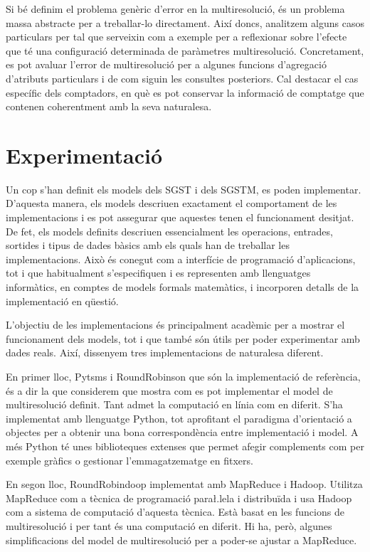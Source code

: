 Si bé definim el problema genèric d'error en la multiresolució, és un
problema massa abstracte per a treballar-lo directament. Així doncs,
analitzem alguns casos particulars per tal que serveixin com a exemple
per a reflexionar sobre l'efecte que té una configuració determinada
de paràmetres multiresolució. Concretament, es pot avaluar l'error de
multiresolució per a algunes funcions d'agregació d'atributs
particulars i de com siguin les consultes posteriors. Cal destacar el
cas específic dels comptadors, en què es pot conservar la informació
de comptatge que contenen coherentment amb la seva naturalesa.



\section{Experimentació}


Un cop s'han definit els models dels \gls{SGST} i dels \gls{SGSTM}, es
poden implementar. D'aquesta manera, els models descriuen exactament el
comportament de les implementacions i es pot assegurar que aquestes
tenen el funcionament desitjat.  De fet, els models definits descriuen
essencialment les operacions, entrades, sortides i tipus de dades
bàsics amb els quals han de treballar les implementacions. Això és
conegut com a interfície de programació d'aplicacions, tot i que
habitualment s'especifiquen i es representen amb llenguatges
informàtics, en comptes de models formals matemàtics, i incorporen
detalls de la implementació en qüestió.


L'objectiu de les implementacions és principalment acadèmic per a
mostrar el funcionament dels models, tot i que també són útils per
poder experimentar amb dades reals. Així, dissenyem tres
implementacions de naturalesa diferent. 



En primer lloc, Pytsms i RoundRobinson que són la implementació de
referència, és a dir la que considerem que mostra com es pot
implementar el model de multiresolució definit.  Tant admet la
computació en línia com en diferit.  S'ha implementat amb llenguatge
Python, tot aprofitant el paradigma d'orientació a objectes per a
obtenir una bona correspondència entre implementació i model. A més
Python té unes biblioteques extenses que permet afegir complements com
per exemple gràfics o gestionar l'emmagatzematge en fitxers.


En segon lloc, RoundRobindoop implementat amb MapReduce i
Hadoop. Utilitza MapReduce com a tècnica de programació para\l.lela i
distribuïda i usa Hadoop com a sistema de computació d'aquesta
tècnica. Està basat en les funcions de multiresolució i per tant és
una computació en diferit. Hi ha, però, algunes simplificacions del
model de multiresolució per a poder-se ajustar a MapReduce.

